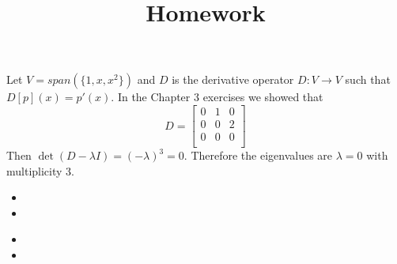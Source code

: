 \documentclass[12pt]{article}
\title{Homework}
\newenvironment{problem}[2][Problem]{\begin{trivlist}
\item[\hskip \labelsep {\bfseries #1}\hskip \labelsep {\bfseries #2}]}{\end{trivlist}}
\begin{document}
\begin{problem}{2.}
Let $V = span(\{1,x,x^2\})$ and $D$ is the derivative operator $D: V \to V$ such that $D[p](x) = p'(x)$. In the Chapter 3 exercises we showed that \[
   D=
  \left[ {\begin{array}{ccc}
   0 & 1 & 0\\
   0 & 0 & 2\\
   0 & 0 & 0\\
  \end{array} } \right]
\]
Then $\det(D - \lambda I) = (-\lambda)^3 = 0$. Therefore the eigenvalues  are $\lambda = 0$ with multiplicity 3. 
 \end{problem}

\begin{problem}{4.} \hfill
\begin{itemize}
\item [(i)] 
\item [(ii)]
\end{itemize}
\end{problem}

\begin{problem}{6.} \hfill
\begin{itemize}
\item [(i)] 
\item [(ii)]
\end{itemize}
\end{problem}

\begin{problem}{8.}
\end{problem}

\begin{problem}{13.} 
\end{problem}

\begin{problem}{15.} 
\end{problem}

\begin{problem}{16.} 
\end{problem}

\begin{problem}{18.} 
\end{problem}

\begin{problem}{20.} 
\end{problem}

\begin{problem}{24.} 
\end{problem}

\begin{problem}{25.}
\end{problem}
\end{document}
